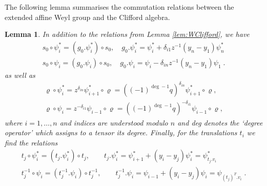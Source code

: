 \documentclass[12pt]{amsart}
\newcommand{\op}[1]{\operatorname{#1}}
\newtheorem{lemma}[prop]{Lemma}
\numberwithin{equation}{section}
\numberwithin{figure}{section}
\begin{document}
The following lemma summarises the commutation relations between the extended affine Weyl group and the Clifford algebra. 
\begin{lemma}\label{lem:WaffClifford}
In addition to the relations from Lemma \ref{lem:WClifford}, we have
\begin{gather}
     s_0\circ\psi^*_i=(g_0.\psi_i^*)\circ s_0,\quad
     g_0.\psi^*_i=\psi^*_i+\delta_{i1}z^{-1}(y_n-y_{1})\psi^*_{n}\\
     s_0\circ\psi_i=(g_0.\psi_i)\circ s_0,\quad
     g_0.\psi_i=\psi_i-\delta_{in}z^{-1}(y_n-y_1)\psi_{1}\;.
\end{gather}
as well as
\begin{equation}\label{rhopsi}
\begin{array}{c}
\varrho\circ\psi^*_i= z^{\delta_{in}} \psi^*_{i+1} \circ \varrho= ((-1)^{\op{deg}-1}q)^{\delta_{in}}\psi^*_{i+1}\circ \varrho, \\
\varrho\circ\psi_i= z^{-\delta_{i1}} \psi_{i-1} \circ \varrho =((-1)^{\op{deg}-1}q)^{-\delta_{i1}}\psi_{i-1}\circ \varrho,
\end{array}
\end{equation}
where $i=1,\ldots,n$ and indices are understood modulo $n$ and deg denotes the `degree operator' which assigns to a tensor its degree. Finally, for the translations $t_i$ we find the relations
\begin{gather} \label{commuterelat}
    t_j\circ\psi^*_i=(t_j.\psi_i^*)\circ t_j,\qquad t_j.\psi_i^*=\psi^*_{i+1}+(y_i-y_j)\psi_i^*=\psi^*_{t_j.v_i}\\
    t^{-1}_j\circ\psi_i=(t^{-1}_j.\psi_i)\circ t^{-1}_j,\qquad t^{-1}_j.\psi_i=\psi_{i-1}+(y_i-y_j)\psi_i=\psi_{(t_j)^T.v_i}\;.
\end{gather}
\end{lemma}
\end{document}

